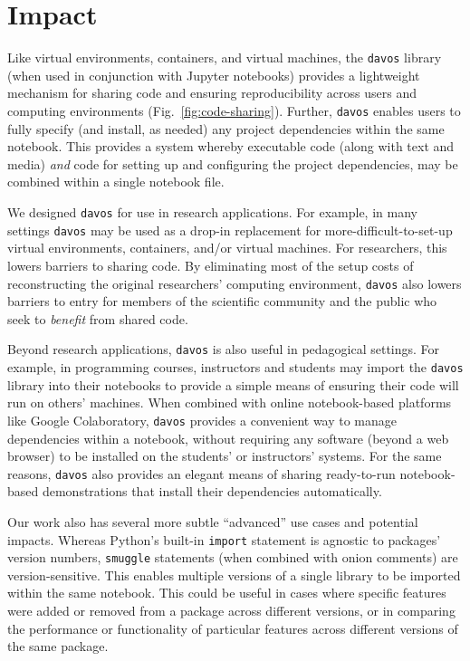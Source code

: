 \documentclass[preprint,12pt, a4paper]{elsarticle}
\begin{document}
\section{Impact}

Like virtual environments, containers, and virtual machines, the
\texttt{davos} library (when used in conjunction with Jupyter
notebooks) provides a lightweight mechanism for sharing code and
ensuring reproducibility across users and computing environments
(Fig.~\ref{fig:code-sharing}).  Further, \texttt{davos} enables users
to fully specify (and install, as needed) any project dependencies
within the same notebook.  This provides a system whereby executable
code (along with text and media) \textit{and} code for setting up and
configuring the project dependencies, may be combined within a single
notebook file.

We designed \texttt{davos} for use in research applications.  For
example, in many settings \texttt{davos} may be used as a drop-in
replacement for more-difficult-to-set-up virtual environments,
containers, and/or virtual machines.  For researchers, this lowers
barriers to sharing code.  By eliminating most of the setup costs
of reconstructing the original researchers' computing environment,
\texttt{davos} also lowers barriers to entry for members of
the scientific community and the public who seek to \textit{benefit}
from shared code.

Beyond research applications, \texttt{davos} is also useful in
pedagogical settings.  For example, in programming courses,
instructors and students may import the \texttt{davos} library into
their notebooks to provide a simple means of ensuring their code will
run on others' machines.  When combined with online notebook-based
platforms like Google Colaboratory, \texttt{davos} provides a
convenient way to manage dependencies within a notebook, without
requiring any software (beyond a web browser) to be installed on the
students' or instructors' systems.  For the same reasons,
\texttt{davos} also provides an elegant means of sharing ready-to-run
notebook-based demonstrations that install their dependencies
automatically.

Our work also has several more subtle ``advanced'' use cases and
potential impacts.  Whereas Python's built-in \texttt{import}
statement is agnostic to packages' version numbers, \texttt{smuggle}
statements (when combined with onion comments) are version-sensitive.
This enables multiple versions of a single library to be
imported within the same notebook.  This could be useful in cases
where specific features were added or removed from a package across
different versions, or in comparing the performance or functionality
of particular features across different versions of the same package.
\end{document}
